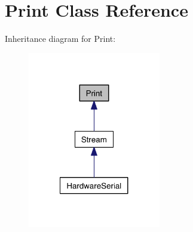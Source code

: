 \hypertarget{classPrint}{
\section{\-Print \-Class \-Reference}
\label{classPrint}
}


\-Inheritance diagram for \-Print\-:\nopagebreak
\begin{figure}[H]
\begin{center}
\leavevmode
\includegraphics[width=164pt]{classPrint__inherit__graph}
\end{center}
\end{figure}
